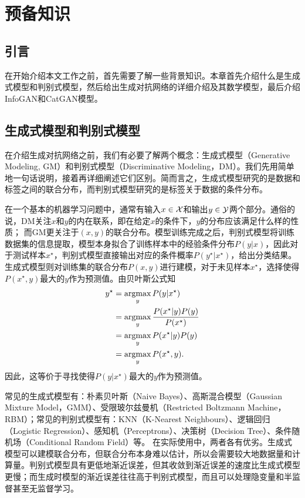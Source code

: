 \chapter{预备知识}\label{chap:preliminaries}
\section{引言}
在开始介绍本文工作之前，首先需要了解一些背景知识。本章首先介绍什么是生成式模型和判别式模型，然后给出生成对抗网络的详细介绍及其数学模型，最后介绍InfoGAN和CatGAN模型。

\section{生成式模型和判别式模型}\label{sec:gm-dm}
在介绍生成对抗网络之前，我们有必要了解两个概念：生成式模型（Generative Modeling, GM）和判别式模型（Discriminative Modeling，DM）。我们先用简单地一句话说明，接着再详细阐述它们区别。简而言之，生成式模型研究的是数据和标签之间的联合分布，而判别式模型研究的是标签关于数据的条件分布。

在一个基本的机器学习问题中，通常有输入$x \in \mathcal{X}$和输出$y \in \mathcal{Y}$两个部分。通俗的说，DM关注$x$和$y$的内在联系，即在给定$x$的条件下，$y$的分布应该满足什么样的性质；
而GM更关注于$(x, y)$的联合分布。模型训练完成之后，判别式模型将训练数据集的信息提取，模型本身拟合了训练样本中的经验条件分布$P(y|x)$，因此对于测试样本$x^{\star}$，判别式模型直接输出对应的条件概率$P(y^{\star} | x^{\star})$，给出分类结果。生成式模型则对训练集的联合分布$P(x,y)$进行建模，对于未见样本$x^{\star}$，选择使得$P(x^{\star}, y)$最大的$y$作为预测值。由贝叶斯公式知
\[
  \begin{split}
    y^{{\star}} &= \mathop{\text{argmax}}_y P(y|x^{{\star}}) \\
       &= \mathop{\text{argmax}}_y \frac{P(x^{\star}|y)P(y)}{P(x^{\star})} \\
       &= \mathop{\text{argmax}}_y P(x^{\star}|y)P(y) \\
       &= \mathop{\text{argmax}}_y P(x^{\star}, y).
  \end{split}
\]
因此，这等价于寻找使得$P(y|x^{\star})$最大的$y$作为预测值。

常见的生成式模型有：朴素贝叶斯（Naive Bayes）、高斯混合模型（Gaussian Mixture Model，GMM）、受限玻尔兹曼机（Restricted Boltzmann Machine，RBM）；常见的判别式模型有：KNN（K-Nearest Neighbours）、逻辑回归（Logistic Regression）、感知机（Perceptrons）、决策树（Decision Tree）、条件随机场（Conditional Random Field）等。
在实际使用中，两者各有优劣。生成式模型可以建模联合分布，但联合分布本身难以估计，所以会需要较大地数据量和计算量。判别式模型具有更低地渐近误差，但其收敛到渐近误差的速度比生成式模型更慢；而生成时模型的渐近误差往往高于判别式模型\citep{ng2002discriminative}，而且可以处理隐变量和半监督甚至无监督学习。



